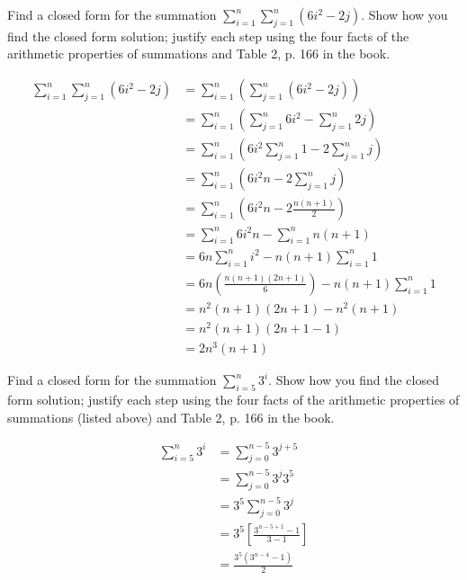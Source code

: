 \begin{questions}
 Find a closed form for the summation $\displaystyle \sum_{i=1}^n \sum_{j=1}^n (6i^2 - 2j)$.  Show how you find the closed form solution; justify each step using the four facts of the arithmetic properties of summations and Table 2, p. 166 in the book.
    \ifprintanswers
        \vspace{-10pt}
   \fi
\begin{solution}
\begin{align*}
        \sum_{i=1}^n \sum_{j=1}^n (6i^2 - 2j) 
        &= \sum_{i=1}^n ( \sum_{j=1}^n (6i^2 - 2j) ) \tag{implied parentheses} \\
        &= \sum_{i=1}^n (\sum_{j=1}^n 6i^2 - \sum_{j=1}^n 2j) \tag{Fact 3} \\
        &= \sum_{i=1}^n (6i^2 \sum_{j=1}^n 1 - 2 \sum_{j=1}^n j) \tag{Fact 4, twice} \\
        &= \sum_{i=1}^n (6i^2n - 2 \sum_{j=1}^n j) \tag{Fact 1} \\
        &= \sum_{i=1}^n (6i^2n - 2 \frac{n(n+1)}{2}) \tag{Table 2} \\
        &= \sum_{i=1}^n 6i^2n - \sum_{i=1}^n  n(n+1) \tag{Fact 3} \\
        &= 6n \sum_{i=1}^n i^2 - n(n+1) \sum_{i=1}^n 1 \tag{Fact 4, twice} \\
        &= 6n (\frac{n(n+1)(2n+1)}{6}) - n(n+1) \sum_{i=1}^n 1 \tag{Table 2} \\
        &= n^2(n+1)(2n+1) - n^2(n+1) \tag{algebra} \\
        &= n^2(n+1)(2n + 1  - 1) \\
        &= 2n^3(n+1) 
    \end{align*}
\end{solution}




 Find a closed form for the summation $\displaystyle \sum_{i=5}^n 3^i$.  Show how you find the closed form solution; justify each step using the four facts of the arithmetic properties of summations (listed above) and Table 2, p. 166 in the book.
    \ifprintanswers
        \vspace{-10pt}
   \fi
\begin{solution}
    \begin{align*}
        \sum_{i=5}^n 3^i  & = \sum_{j=0}^{n-5} 3^{j+5} \tag{change of index} \\
        & = \sum_{j=0}^{n-5} 3^{j}3^{5} \tag{algebra} \\
        & = 3^5 \sum_{j=0}^{n-5} 3^j    \tag{Fact 4} \\
        & = 3^5 \left[ \frac{3^{n-5+1} - 1}{3 - 1} \right] \tag{Table } \\
        & = \frac{ 3^5(3^{n-4} - 1) }{ 2 } \tag{algebra}
    \end{align*}


\end{solution}
\end{questions}
